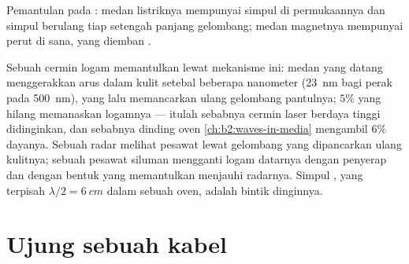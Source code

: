 \begin{omfigure}

{\small Pemantulan pada : medan listriknya mempunyai
simpul di permukaannya dan simpul  berulang tiap setengah
panjang gelombang; medan magnetnya mempunyai perut di sana, yang diemban
.}
\end{omfigure}

\begin{example}\label{ex:b2:wave-interfaces:conductoruses}
Sebuah cermin logam memantulkan lewat mekanisme ini: medan yang datang menggerakkan
arus dalam kulit setebal beberapa nanometer (\qty{23}{nm} bagi perak pada
\qty{500}{nm}), yang lalu memancarkan ulang gelombang pantulnya; $5\%$ yang hilang
memanaskan logamnya --- itulah sebabnya cermin laser berdaya tinggi didinginkan,
dan sebabnya dinding oven \cref{ch:b2:waves-in-media} mengambil $6\%$
dayanya. Sebuah radar melihat pesawat lewat gelombang yang dipancarkan ulang kulitnya; sebuah
pesawat siluman mengganti logam datarnya dengan penyerap dan dengan bentuk yang
memantulkan menjauhi radarnya. Simpul , yang terpisah $\lambda/2 =
\qty{6}{cm}$ dalam sebuah oven, adalah bintik dinginnya.
\end{example}

\section{Ujung sebuah kabel}

